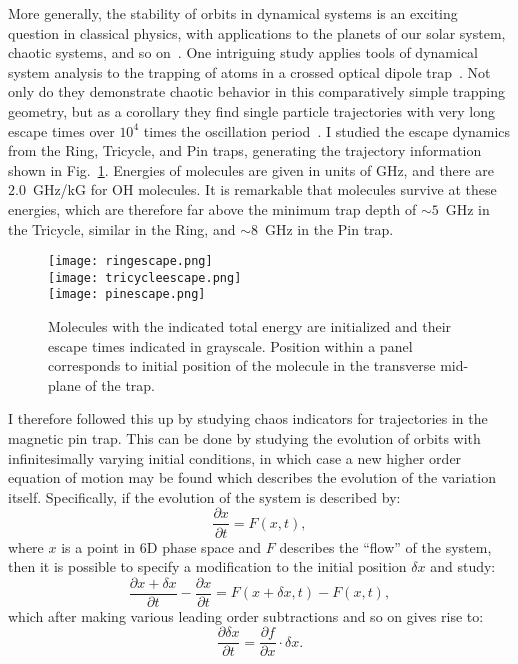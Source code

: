 More generally, the stability of orbits in dynamical systems is an exciting question in classical physics, with applications to the planets of our solar system, chaotic systems, and so on~\cite{dumas2014kam}.
One intriguing study applies tools of dynamical system analysis to the trapping of atoms in a crossed optical dipole trap~\cite{Gonzalez-Ferez2014}.
Not only do they demonstrate chaotic behavior in this comparatively simple trapping geometry, but as a corollary they find single particle trajectories with very long escape times over $10^4$ times the oscillation period~\citep[Fig.~11]{Gonzalez-Ferez2014}.
I studied the escape dynamics from the Ring, Tricycle, and Pin traps, generating the trajectory information shown in Fig.~\ref{escapes}.
Energies of molecules are given in units of GHz, and there are $2.0$~GHz/kG for OH molecules.
It is remarkable that molecules survive at these energies, which are therefore far above the minimum trap depth of $\sim5$~GHz in the Tricycle, similar in the Ring, and $\sim8$~GHz in the Pin trap.

\begin{figure}[ht!]
\centering
\texttt{[image: ringescape.png]}\\
\texttt{[image: tricycleescape.png]}\\
\texttt{[image: pinescape.png]}
\caption[Escape Dynamics in the Ring, Tricycle and Pin traps.]{Molecules with the indicated total energy are initialized and their escape times indicated in grayscale. Position within a panel corresponds to initial position of the molecule in the transverse mid-plane of the trap.
\label{escapes}}
\end{figure}

I therefore followed this up by studying chaos indicators for trajectories in the magnetic pin trap.
This can be done by studying the evolution of orbits with infinitesimally varying initial conditions, in which case a new higher order equation of motion may be found which describes the evolution of the variation itself.
Specifically, if the evolution of the system is described by:
\begin{equation}
\frac{\partial x}{\partial t} = F(x,t),
\end{equation}
where $x$ is a point in 6D phase space and $F$ describes the ``flow'' of the system, then it is possible to specify a modification to the initial position $\delta x$ and study:
\begin{equation}
\frac{\partial x+\delta x}{\partial t} - \frac{\partial x}{\partial t}= F(x+\delta x,t) - F(x,t),
\end{equation}
which after making various leading order subtractions and so on gives rise to:
\begin{equation}
\frac{\partial \delta x}{\partial t} = \frac{\partial f}{\partial x}\cdot\delta x.  \label{eqvar}
\end{equation}

